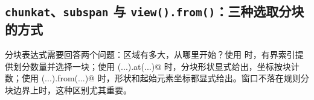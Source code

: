 \subsection*{\texttt{chunkat}、\texttt{subspan} 与 \texttt{view().from()}：三种选取分块的方式}

分块表达式需要回答两个问题：区域有多大，从哪里开始？使用 \co@chunkat@ 时，有界索引提供划分数量并选择一块；使用 \co@subspan(...).at(...)@ 时，分块形状显式给出，坐标按块计数；使用 \co@view(...).from(...)@ 时，形状和起始元素坐标都显式给出。窗口不落在规则分块边界上时，这种区别尤其重要。
